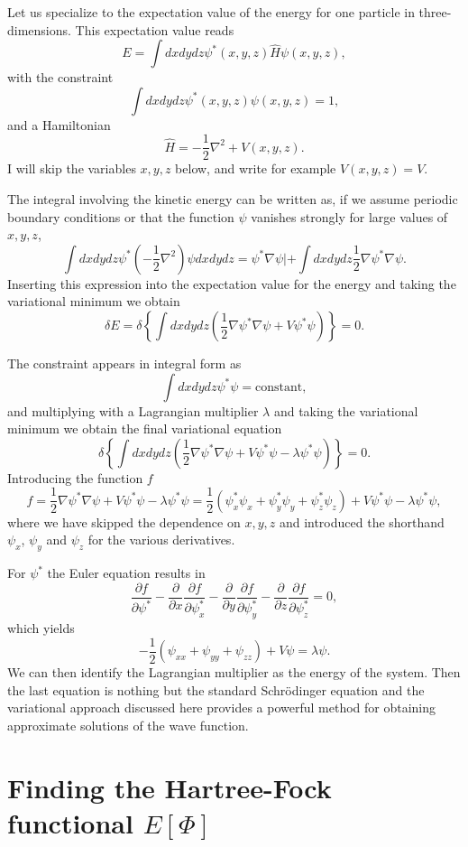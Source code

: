 Let us specialize to the expectation value of the energy for one particle in three-dimensions.
This expectation value reads
\[
  E=\int dxdydz \psi^*(x,y,z) \hat{H} \psi(x,y,z),
\]
with the constraint
\[
 \int dxdydz \psi^*(x,y,z) \psi(x,y,z)=1,
\]
and a Hamiltonian
\[
\hat{H}=-\frac{1}{2}\nabla^2+V(x,y,z).
\]
I will skip the variables $x,y,z$ below, and write for example $V(x,y,z)=V$.

The integral involving the kinetic energy can be written as, if we assume periodic boundary conditions or that the function $\psi$ vanishes
strongly for large values of $x,y,z$, 
 \[
  \int dxdydz \psi^* \left(-\frac{1}{2}\nabla^2\right) \psi dxdydz = \psi^*\nabla\psi|+\int dxdydz\frac{1}{2}\nabla\psi^*\nabla\psi.
\]
Inserting this expression into the expectation value for the energy and taking the variational minimum  we obtain
\[
\delta E = \delta \left\{\int dxdydz\left( \frac{1}{2}\nabla\psi^*\nabla\psi+V\psi^*\psi\right)\right\} = 0.
\]

The constraint appears in integral form as 
\[
 \int dxdydz \psi^* \psi=\mathrm{constant},
\]
and multiplying with a Lagrangian multiplier $\lambda$ and taking the variational minimum we obtain the final variational equation
\[
\delta \left\{\int dxdydz\left( \frac{1}{2}\nabla\psi^*\nabla\psi+V\psi^*\psi-\lambda\psi^*\psi\right)\right\} = 0.
\]
Introducing the function  $f$
\[
  f =  \frac{1}{2}\nabla\psi^*\nabla\psi+V\psi^*\psi-\lambda\psi^*\psi=
\frac{1}{2}(\psi^*_x\psi_x+\psi^*_y\psi_y+\psi^*_z\psi_z)+V\psi^*\psi-\lambda\psi^*\psi,
\]
where we have skipped the dependence on $x,y,z$ and introduced the shorthand $\psi_x$, $\psi_y$ and $\psi_z$  for the various derivatives.

For $\psi^*$ the Euler  equation results in
\[
\frac{\partial f}{\partial \psi^*}- \frac{\partial }{\partial x}\frac{\partial f}{\partial \psi^*_x}-\frac{\partial }{\partial y}\frac{\partial f}{\partial \psi^*_y}-\frac{\partial }{\partial z}\frac{\partial f}{\partial \psi^*_z}=0,
\] 
which yields 
\[
    -\frac{1}{2}(\psi_{xx}+\psi_{yy}+\psi_{zz})+V\psi=\lambda \psi.
\]
We can then identify the  Lagrangian multiplier as the energy of the system. Then the last equation is 
nothing but the standard 
Schr\"odinger equation and the variational  approach discussed here provides 
a powerful method for obtaining approximate solutions of the wave function.

\section{Finding the Hartree-Fock functional $E[\Phi]$}

